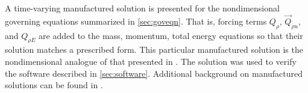 \label{sec:mms}

A time-varying manufactured solution is presented for the nondimensional
governing equations summarized in \autoref{sec:goveqn}.  That is, forcing terms
$Q_{\rho}$, $\vec{Q}_{\rho{}u}$, and $Q_{\rho{}E}$ are added to the mass,
momentum, total energy equations so that their solution matches a prescribed
form.  This particular manufactured solution is the nondimensional analogue of
that presented in \citet{Ulerich2012MMS}.  The solution was used to verify the
software described in \autoref{sec:software}.  Additional background on
manufactured solutions can be found in \citet{MASA}.


